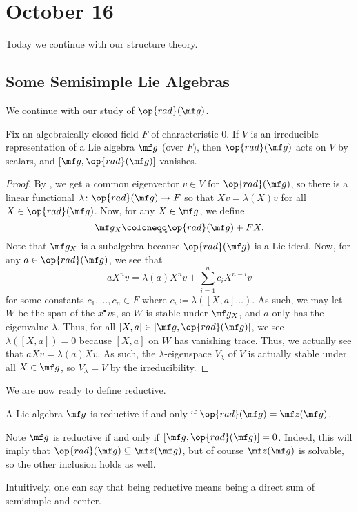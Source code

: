 \documentclass[../notes.tex]{subfiles}
\begin{document}
\section{October 16}
Today we continue with our structure theory.

\subsection{Some Semisimple Lie Algebras}
We continue with our study of $\op{rad}(\mf g)$.
\begin{proposition}
	Fix an algebraically closed field $F$ of characteristic $0$. If $V$ is an irreducible representation of a Lie algebra $\mf g$ (over $F$), then $\op{rad}(\mf g)$ acts on $V$ by scalars, and $[\mf g,\op{rad}(\mf g)]$ vanishes.
\end{proposition}
\begin{proof}
	By , we get a common eigenvector $v\in V$ for $\op{rad}(\mf g)$, so there is a linear functional $\lambda\colon\op{rad}(\mf g)\to F$ so that $Xv=\lambda(X)v$ for all $X\in\op{rad}(\mf g)$. Now, for any $X\in\mf g$, we define
	\[\mf g_X\coloneqq\op{rad}(\mf g)+FX.\]
	Note that $\mf g_X$ is a subalgebra because $\op{rad}(\mf g)$ is a Lie ideal. Now, for any $a\in\op{rad}(\mf g)$, we see that
	\[aX^nv=\lambda(a)X^nv+\sum_{i=1}^nc_iX^{n-i}v\]
	for some constants $c_1,\ldots,c_n\in F$ where $c_i\coloneqq\lambda([X,a]\ldots)$. As such, we  may let $W$ be the span of the $x^\bullet v$s, so $W$ is stable under $\mf g_X$, and $a$ only has the eigenvalue $\lambda$. Thus, for all $[X,a]\in[\mf g,\op{rad}(\mf g)]$, we see $\lambda([X,a])=0$ because $[X,a]$ on $W$ has vanishing trace. Thus, we actually see that $aXv=\lambda(a)Xv$. As such, the $\lambda$-eigenspace $V_\lambda$ of $V$ is actually stable under all $X\in\mf g$, so $V_\lambda=V$ by the irreducibility.
\end{proof}
We are now ready to define reductive.
\begin{definition}[reductive]
	A Lie algebra $\mf g$ is reductive if and only if $\op{rad}(\mf g)=\mf z(\mf g)$.
\end{definition}
\begin{remark}
	Note $\mf g$ is reductive if and only if $[\mf g,\op{rad}(\mf g)]=0$. Indeed, this will imply that $\op{rad}(\mf g)\subseteq\mf z(\mf g)$, but of course $\mf z(\mf g)$ is solvable, so the other inclusion holds as well.
\end{remark}
\begin{remark}
	Intuitively, one can say that being reductive means being a direct sum of semisimple and center.
\end{remark}
\end{document}
